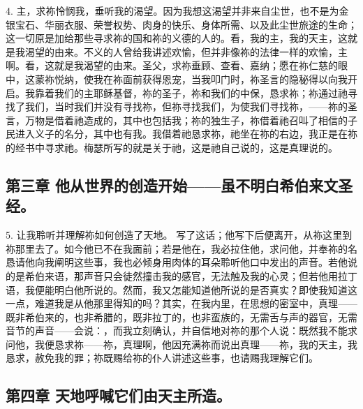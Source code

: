 4. 主，求祢怜悯我，垂听我的渴望。因为我想这渴望并非来自尘世，也不是为金银宝石、华丽衣服、荣誉权势、肉身的快乐、身体所需、以及此尘世旅途的生命；这一切原是加给那些寻求祢的国和祢的义德的人的。看，我的主，我的天主，这就是我渴望的由来。不义的人曾给我讲述欢愉，但并非像祢的法律一样的欢愉，主啊。看，这就是我渴望的由来。圣父，求祢垂顾、查看、嘉纳；愿在祢仁慈的眼中，这蒙祢悦纳，使我在祢面前获得恩宠，当我叩门时，祢圣言的隐秘得以向我开启。我靠着我们的主耶稣基督，祢的圣子，祢和我们的中保，恳求祢；祢通过祂寻找了我们，当时我们并没有寻找祢，但祢寻找我们，为使我们寻找祢，——祢的圣言，万物是借着祂造成的，其中也包括我；祢的独生子，祢借着祂召叫了相信的子民进入义子的名分，其中也有我。我借着祂恳求祢，祂坐在祢的右边，我正是在祢的经书中寻求祂。梅瑟所写的就是关于祂，这是祂自己说的，这是真理说的。\par


\subsection{第三章 他从世界的创造开始——虽不明白希伯来文圣经。}

5. 让我聆听并理解祢如何创造了天地。 写了这话；他写下后便离开，从祢这里到祢那里去了。如今他已不在我面前；若是他在，我必拉住他，求问他，并奉祢的名恳请他向我阐明这些事，我也必倾身用肉体的耳朵聆听他口中发出的声音。若他说的是希伯来语，那声音只会徒然撞击我的感官，无法触及我的心灵；但若他用拉丁语，我便能明白他所说的。然而，我又怎能知道他所说的是否真实？即使我知道这一点，难道我是从他那里得知的吗？其实，在我内里，在思想的密室中，真理——既非希伯来的，也非希腊的，既非拉丁的，也非蛮族的，无需舌与声的器官，无需音节的声音——会说：，而我立刻确认，并自信地对祢的那个人说：既然我不能求问他，我便恳求祢——祢，真理啊，他因充满祢而说出真理——祢，我的天主，我恳求，赦免我的罪；祢既赐给祢的仆人讲述这些事，也请赐我理解它们。\par


\subsection{第四章 天地呼喊它们由天主所造。}

